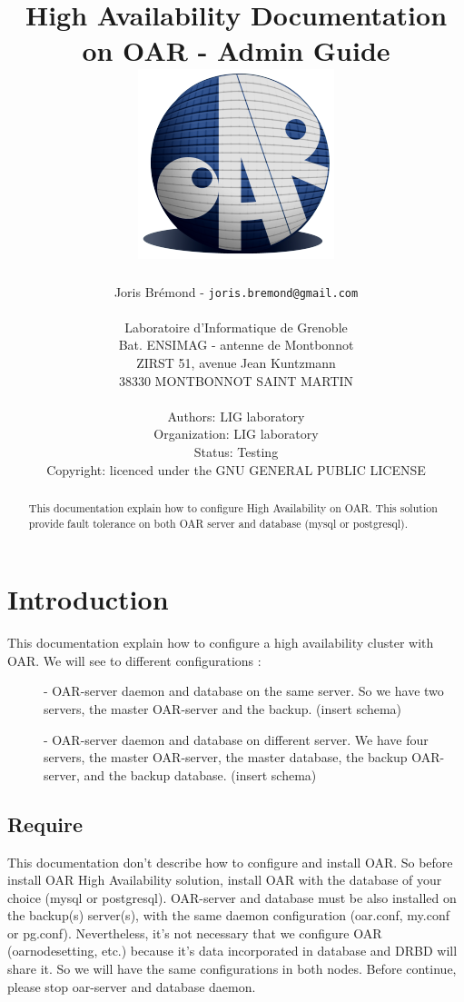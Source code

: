 \documentclass[a4paper,10pt]{report}
\title{High Availability Documentation on OAR - Admin Guide\\
\includegraphics[scale=0.7]{schema/oar_logo_detoure.png}}
\author{Joris Brémond - \texttt{joris.bremond@gmail.com}\\
\\
Laboratoire d'Informatique de Grenoble\\
Bat. ENSIMAG - antenne de Montbonnot\\
ZIRST 51, avenue Jean Kuntzmann\\
38330 MONTBONNOT SAINT MARTIN\\
\\
Authors: LIG laboratory\\
Organization: LIG laboratory\\
Status: Testing\\
Copyright: licenced under the GNU GENERAL PUBLIC LICENSE\\
}
\begin{document}
\maketitle
\tableofcontents

\begin{abstract}
This documentation explain how to configure High Availability on OAR. This solution provide fault tolerance on both OAR server and database (mysql or postgresql).
\end{abstract}












  
\chapter{Introduction}
This documentation explain how to configure a high availability cluster with OAR. We will see to different configurations :
\begin{description}
\item[]- OAR-server daemon and database on the same server. So we have two servers, the master OAR-server and the backup.
(insert schema)
\item[]- OAR-server daemon and database on different server. We have four servers, the master OAR-server, the master database, the backup OAR-server, and the backup database.
(insert schema)
\end{description}


\section{Require}
This documentation don't describe how to configure and install OAR. So before install OAR High Availability solution, 
install OAR with the database of your choice (mysql or postgresql). OAR-server and database must be also installed on the backup(s) server(s), 
with the same daemon configuration (oar.conf, my.conf or pg.conf). 
Nevertheless, it's not necessary that we configure OAR (oarnodesetting, etc.) because it's data incorporated in database and DRBD will share it. So we will have the same configurations in both nodes.
Before continue, please stop oar-server and database daemon.
\end{document}
